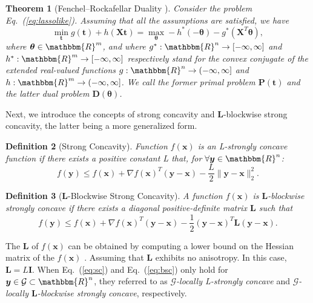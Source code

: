 \documentclass[11pt]{article}
\newtheorem{thm}{Theorem}
\newtheorem{definition}[thm]{Definition}
\newcommand{\mat}[1]{\mathbf{#1}}
\renewcommand{\vec}[1]{\bm{#1}}
\begin{document}
\begin{thm}[Fenchel--Rockafellar Duality {\cite{Rockafellar_Springer_1998}}]
\label{Thm:FRD}
Consider the problem Eq.~(\ref{eq:lassolike}). Assuming that all the assumptions are satisfied, we have
\begin{equation}
\label{Eq:FRD}
\min_{\vec{t}} g(\vec{t}) + h(\mat{X}\vec{t}) = \max_{\vec{\vec{\theta}}} -h^*(-\vec{\theta})-g^*(\mat{X}^T\vec{\theta}),
\end{equation}
where $\vec{\theta} \in \mathbbm{R}^m$, and where $g^*: \mathbbm{R}^n \rightarrow [-\infty, \infty]$ and $h^*: \mathbbm{R}^m \rightarrow [-\infty, \infty]$ respectively stand for the convex conjugate of the extended real-valued functions $g: \mathbbm{R}^{n} \rightarrow (-\infty, \infty]$ and $h: \mathbbm{R}^m \rightarrow (-\infty, \infty]$. We call the former primal problem $\mat P(\vec t)$ and the latter dual problem $\mat D(\vec \theta)$.
\end{thm}

Next, we introduce the concepts of strong concavity and $\mat L$-blockwise strong concavity, the latter being a more generalized form.
\begin{definition}[Strong Concavity]
\label{Def:SC}
Function $f(\vec x)$ is an {\it L-strongly concave} function if there exists a positive constant L that, for $\forall \vec y \in \mathbbm{R}^{n}$:
\begin{equation}
\label{eq:sc}
f(\vec y) \leq f(\vec x) +\nabla f(\vec x)^{T}(\vec y-\vec x) - \frac{L}{2}\|\vec y -\vec x\|_2^2.
\end{equation}
\end{definition}

\begin{definition}[$\mat L$-Blockwise Strong Concavity]
\label{Def:BSC}
A function $f(\vec x)$ is $\mat L$-blockwise strongly concave if there exists a diagonal positive-definite matrix $\mat L$ such that
\begin{equation}
\label{eq:bsc}
f(\vec y) \leq f(\vec x) +\nabla f(\vec x)^{T}(\vec y-\vec x) - \frac{1}{2}(\vec y -\vec x)^{T}\mat L (\vec y -\vec x).
\end{equation}
\end{definition}

The $\mat L$ of $f(\vec x)$ can be obtained by computing a lower bound on the Hessian matrix of the $f(\vec x)$ \cite{DBLP:books/cu/BV2014,DBLP:journals/siamjo/BeckT13}. Assuming that $\mat L$ exhibits no anisotropy. In this case, $\mat L = L\textbf{I}$. When Eq.~(\ref{eq:sc}) and Eq.~(\ref{eq:bsc}) only hold for $\vec y \in \mathcal{G} \subset \mathbbm{R}^{n}$, they referred to as {\it $\mathcal{G}$-locally L-strongly concave} and {\it $\mathcal{G}$-locally $\mat L$-blockwise strongly concave}, respectively.
\end{document}
